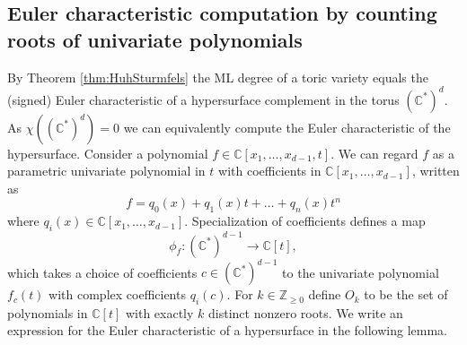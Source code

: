 \documentclass[12pt,reqno]{amsart}   	%
\theoremstyle{plain}
\theoremstyle{definition}
\theoremstyle{remark}
\newcommand{\Z}{\mathbb{Z}}
\newcommand{\C}{\mathbb{C}}
\begin{document}
\subsection{Euler characteristic computation by counting roots of univariate polynomials}
By Theorem \ref{thm:HuhSturmfels} the ML degree of a toric variety equals the (signed) Euler characteristic of a hypersurface complement in the torus $(\C^{\ast})^d$. As $\chi ((\C^\ast)^d) = 0$ we can equivalently compute the Euler characteristic of the hypersurface. Consider a polynomial $f\in \C[x_1,\dots,x_{d-1},t]$. We can regard $f$ as a parametric univariate polynomial in $t$ with coefficients in $\C[x_1,\dots,x_{d-1}]$, written as
\[
    f= q_0(x)+q_1(x)t+\dots +q_n(x)t^n
\]
where $q_{i}(x)\in \C[x_1,\ldots,x_{d-1}]$.
Specialization of coefficients defines a map 
\[
    \phi_f \colon (\C^\ast)^{d-1} \to \C[t] ,
\]
which takes a choice of coefficients $c\in (\C^{\ast})^{d-1}$ to the univariate
polynomial $f_c(t)$ with complex coefficients $q_{i}(c)$.
For $k\in \Z_{\geq0}$ define $O_k$ to be the set of polynomials in $\C[t]$ with exactly $k$ distinct nonzero roots. We write an expression for the Euler characteristic of a hypersurface in the following lemma. 
\end{document}
